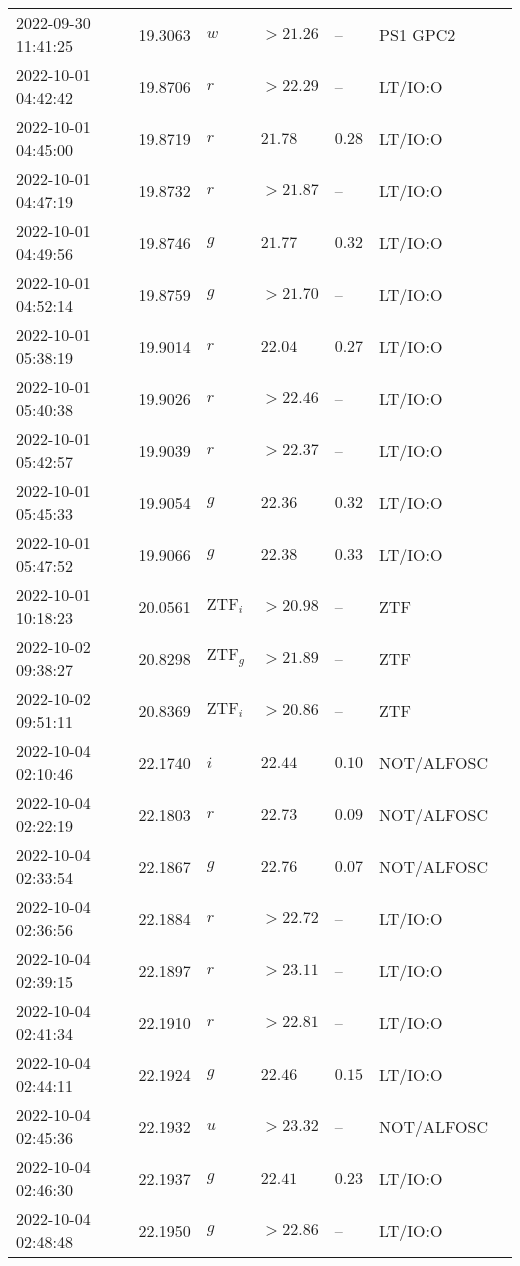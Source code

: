 \documentclass{nature_plusfigure}
\begin{document}
\begin{supplement}
\begin{center}
\begin{longtable}{lllllll}
2022-09-30 11:41:25 & 19.3063 & $w$ & $>21.26$ & -- & PS1 GPC2 &  \\ 
2022-10-01 04:42:42 & 19.8706 & $r$ & $>22.29$ & -- & LT/IO:O &  \\ 
2022-10-01 04:45:00 & 19.8719 & $r$ & $21.78$ & $0.28$ & LT/IO:O &  \\ 
2022-10-01 04:47:19 & 19.8732 & $r$ & $>21.87$ & -- & LT/IO:O &  \\ 
2022-10-01 04:49:56 & 19.8746 & $g$ & $21.77$ & $0.32$ & LT/IO:O &  \\ 
2022-10-01 04:52:14 & 19.8759 & $g$ & $>21.70$ & -- & LT/IO:O &  \\ 
2022-10-01 05:38:19 & 19.9014 & $r$ & $22.04$ & $0.27$ & LT/IO:O &  \\ 
2022-10-01 05:40:38 & 19.9026 & $r$ & $>22.46$ & -- & LT/IO:O &  \\ 
2022-10-01 05:42:57 & 19.9039 & $r$ & $>22.37$ & -- & LT/IO:O &  \\ 
2022-10-01 05:45:33 & 19.9054 & $g$ & $22.36$ & $0.32$ & LT/IO:O &  \\ 
2022-10-01 05:47:52 & 19.9066 & $g$ & $22.38$ & $0.33$ & LT/IO:O &  \\ 
2022-10-01 10:18:23 & 20.0561 & $\mathrm{ZTF}_{i}$ & $>20.98$ & -- & ZTF &  \\ 
2022-10-02 09:38:27 & 20.8298 & $\mathrm{ZTF}_{g}$ & $>21.89$ & -- & ZTF &  \\ 
2022-10-02 09:51:11 & 20.8369 & $\mathrm{ZTF}_{i}$ & $>20.86$ & -- & ZTF &  \\ 
2022-10-04 02:10:46 & 22.1740 & $i$ & $22.44$ & $0.10$ & NOT/ALFOSC &  \\ 
2022-10-04 02:22:19 & 22.1803 & $r$ & $22.73$ & $0.09$ & NOT/ALFOSC &  \\ 
2022-10-04 02:33:54 & 22.1867 & $g$ & $22.76$ & $0.07$ & NOT/ALFOSC &  \\ 
2022-10-04 02:36:56 & 22.1884 & $r$ & $>22.72$ & -- & LT/IO:O &  \\ 
2022-10-04 02:39:15 & 22.1897 & $r$ & $>23.11$ & -- & LT/IO:O &  \\ 
2022-10-04 02:41:34 & 22.1910 & $r$ & $>22.81$ & -- & LT/IO:O &  \\ 
2022-10-04 02:44:11 & 22.1924 & $g$ & $22.46$ & $0.15$ & LT/IO:O &  \\ 
2022-10-04 02:45:36 & 22.1932 & $u$ & $>23.32$ & -- & NOT/ALFOSC &  \\ 
2022-10-04 02:46:30 & 22.1937 & $g$ & $22.41$ & $0.23$ & LT/IO:O &  \\ 
2022-10-04 02:48:48 & 22.1950 & $g$ & $>22.86$ & -- & LT/IO:O &  \\ 

\end{longtable}
\end{center}
\end{supplement}
\end{document}
